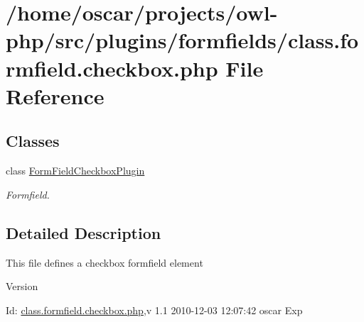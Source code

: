 \section{/home/oscar/projects/owl-\/php/src/plugins/formfields/class.formfield.checkbox.php File Reference}
\label{class_8formfield_8checkbox_8php}
\subsection*{Classes}
\begin{DoxyCompactItemize}
\item 
class \hyperlink{classFormFieldCheckboxPlugin}{FormFieldCheckboxPlugin}
\begin{DoxyCompactList}\small\item\em Formfield. \item\end{DoxyCompactList}\end{DoxyCompactItemize}


\subsection{Detailed Description}
This file defines a checkbox formfield element \begin{DoxyVersion}{Version}

\end{DoxyVersion}
\begin{DoxyParagraph}{Id:}
\hyperlink{class_8formfield_8checkbox_8php}{class.formfield.checkbox.php},v 1.1 2010-\/12-\/03 12:07:42 oscar Exp 
\end{DoxyParagraph}
